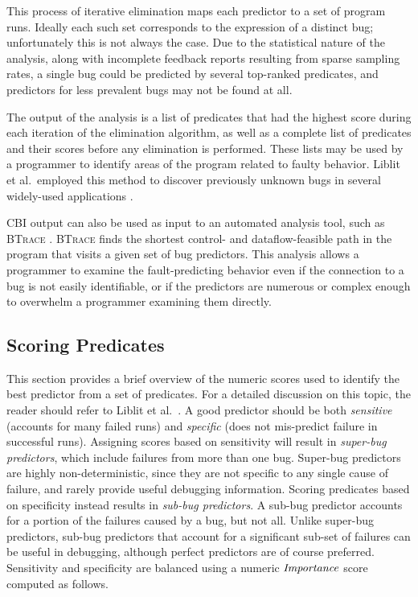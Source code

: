 This process of iterative elimination maps each predictor to a set of program runs.  Ideally each such set corresponds to the expression of a distinct bug; unfortunately this is not always the case.  Due to the statistical nature of the analysis, along with incomplete feedback reports resulting from sparse sampling rates, a single bug could be predicted by several top-ranked predicates, and predictors for less prevalent bugs may not be found at all.

The output of the analysis is a list of predicates that had the highest score during each iteration of the elimination algorithm, as well as a complete list of predicates and their scores before any elimination is performed.  These lists may be used by a programmer to identify areas of the program related to faulty behavior.  Liblit et al.\ employed this method to discover previously unknown bugs in several widely-used applications \cite{Liblit:2003:BIRPS,Liblit:2005:SSBI}.

CBI output can also be used as input to an automated analysis tool, such as \textsc{BTrace} \cite{Lal:2006:POPAD}. \textsc{BTrace} finds the shortest control- and dataflow-feasible path in the program that visits a given set of bug predictors.  This analysis allows a programmer to examine the fault-predicting behavior even if the connection to a bug is not easily identifiable, or if the predictors are numerous or complex enough to overwhelm a programmer examining them directly.

\subsection{Scoring Predicates}
\label{sec-scoring}
This section provides a brief overview of the numeric scores used to identify the best predictor from a set of predicates.  For a detailed discussion on this topic, the reader should refer to Liblit et al.\ \cite{Liblit:2005:SSBI}.  A good predictor should be both \emph{sensitive} (accounts for many failed runs) and \emph{specific} (does not mis-predict failure in successful runs).  Assigning scores based on sensitivity will result in \emph{super-bug predictors}, which include failures from more than one bug.  Super-bug predictors are highly non-deterministic, since they are not specific to any single cause of failure, and rarely provide useful debugging information.  Scoring predicates based on specificity instead results in \emph{sub-bug predictors}.  A sub-bug predictor accounts for a portion of the failures caused by a bug, but not all.  Unlike super-bug predictors, sub-bug predictors that account for a significant sub-set of failures can be useful in debugging, although perfect predictors are of course preferred.  Sensitivity and specificity are balanced using a numeric $\mathit{Importance}$ score computed as follows.

